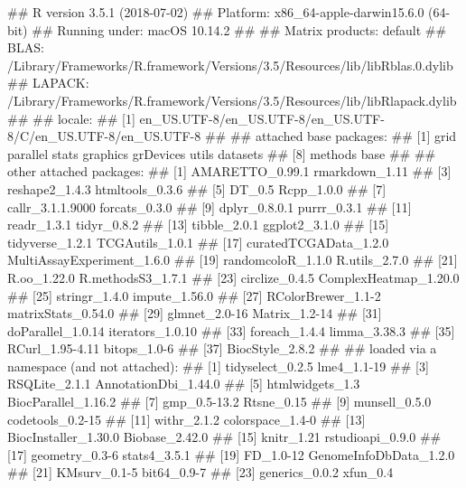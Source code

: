 \documentclass[8pt,a4,]{article}
\renewenvironment{verbatim}{\color{codecolor}\begin{myshaded}\begin{oldverbatim}}{\end{oldverbatim}\end{myshaded}}
\begin{document}
\begin{verbatim}
## R version 3.5.1 (2018-07-02)
## Platform: x86_64-apple-darwin15.6.0 (64-bit)
## Running under: macOS  10.14.2
## 
## Matrix products: default
## BLAS: /Library/Frameworks/R.framework/Versions/3.5/Resources/lib/libRblas.0.dylib
## LAPACK: /Library/Frameworks/R.framework/Versions/3.5/Resources/lib/libRlapack.dylib
## 
## locale:
## [1] en_US.UTF-8/en_US.UTF-8/en_US.UTF-8/C/en_US.UTF-8/en_US.UTF-8
## 
## attached base packages:
## [1] grid      parallel  stats     graphics  grDevices utils     datasets 
## [8] methods   base     
## 
## other attached packages:
##  [1] AMARETTO_0.99.1            rmarkdown_1.11            
##  [3] reshape2_1.4.3             htmltools_0.3.6           
##  [5] DT_0.5                     Rcpp_1.0.0                
##  [7] callr_3.1.1.9000           forcats_0.3.0             
##  [9] dplyr_0.8.0.1              purrr_0.3.1               
## [11] readr_1.3.1                tidyr_0.8.2               
## [13] tibble_2.0.1               ggplot2_3.1.0             
## [15] tidyverse_1.2.1            TCGAutils_1.0.1           
## [17] curatedTCGAData_1.2.0      MultiAssayExperiment_1.6.0
## [19] randomcoloR_1.1.0          R.utils_2.7.0             
## [21] R.oo_1.22.0                R.methodsS3_1.7.1         
## [23] circlize_0.4.5             ComplexHeatmap_1.20.0     
## [25] stringr_1.4.0              impute_1.56.0             
## [27] RColorBrewer_1.1-2         matrixStats_0.54.0        
## [29] glmnet_2.0-16              Matrix_1.2-14             
## [31] doParallel_1.0.14          iterators_1.0.10          
## [33] foreach_1.4.4              limma_3.38.3              
## [35] RCurl_1.95-4.11            bitops_1.0-6              
## [37] BiocStyle_2.8.2           
## 
## loaded via a namespace (and not attached):
##   [1] tidyselect_0.2.5              lme4_1.1-19                  
##   [3] RSQLite_2.1.1                 AnnotationDbi_1.44.0         
##   [5] htmlwidgets_1.3               BiocParallel_1.16.2          
##   [7] gmp_0.5-13.2                  Rtsne_0.15                   
##   [9] munsell_0.5.0                 codetools_0.2-15             
##  [11] withr_2.1.2                   colorspace_1.4-0             
##  [13] BiocInstaller_1.30.0          Biobase_2.42.0               
##  [15] knitr_1.21                    rstudioapi_0.9.0             
##  [17] geometry_0.3-6                stats4_3.5.1                 
##  [19] FD_1.0-12                     GenomeInfoDbData_1.2.0       
##  [21] KMsurv_0.1-5                  bit64_0.9-7                  
##  [23] generics_0.0.2                xfun_0.4                     

\end{verbatim}
\end{document}
